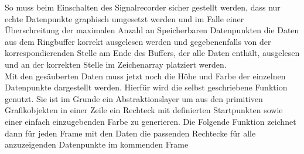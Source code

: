 So muss beim Einschalten des Signalrecorder sicher gestellt werden, dass nur echte Datenpunkte graphisch umgesetzt werden und im Falle einer Überschreitung der maximalen Anzahl an Speicherbaren Datenpunkten die Daten aus dem Ringbuffer korrekt ausgelesen werden und gegebenenfalls von der korrespondierenden Stelle am Ende des Buffers, der alle Daten enthält, ausgelesen und an der korrekten Stelle im Zeichenarray platziert werden. \\
Mit den gesäuberten Daten muss jetzt noch die Höhe und Farbe der einzelnen Datenpunkte dargestellt werden. Hierfür wird die selbst geschriebene Funktion  genutzt. Sie ist im Grunde ein Abstraktionslayer um aus den primitiven Grafikobjekten in einer Zeile ein Rechteck mit definierten Startpunkten sowie einer einfach einzugebenden Farbe zu generieren. Die Folgende Funktion zeichnet dann für jeden Frame mit den Daten die passenden Rechtecke für alle anzuzeigenden Datenpunkte im kommenden Frame \\

